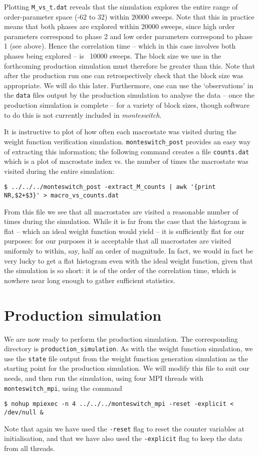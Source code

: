 \documentclass{report}
\begin{document}
Plotting \texttt{M\_vs\_t.dat} reveals that the simulation explores the entire range of order-parameter space (-62 to 32) within 20000 sweeps. Note that this
in practice means that both phases are explored within 20000 sweeps, since high order parameters correspond to phase 2 and low order parameters correspond
to phase 1 (see above). Hence the correlation time -- which in this case involves both phases being explored -- is ~10000 sweeps. The 
block size we use in the
forthcoming production simulation must therefore be greater than this. Note that after the production run one can retrospectively check that the
block size was appropriate. We will do this later. Furthermore, one can use the `observations' in the \texttt{data} files output by the production simulation to
analyse the data -- once the production simulation is complete -- for a variety of block sizes, though software to do this is not currently included in
\emph{monteswitch}.

It is instructive to plot of how often each macrostate was visited during the weight function verification simulation. \texttt{monteswitch\_post}
provides an easy way of extracting this information; the following command creates a file \texttt{counts.dat} which is a plot of macrostate index vs. the
number of times the  macrostate was visited during the entire simulation:
\begin{verbatim}
$ ../../../monteswitch_post -extract_M_counts | awk '{print 
NR,$2+$3}' > macro_vs_counts.dat
\end{verbatim}
From this file we see that all macrostates are visited a reasonable number of times during the simulation. While it is far from the case that the
histogram is flat -- which an ideal weight function would yield -- it is sufficiently flat for our purposes: for our purposes it is acceptable that
all macrostates are visited uniformly to within, say, half an order of magnitude. In fact, we would in fact be very lucky to get a flat histogram
even with the ideal weight function, given that the simulation is so short: it is of the order of the correlation time, which is nowhere near long
enough to gather sufficient statistics.


\section{Production simulation}
We are now ready to perform the production simulation. The corresponding directory is \texttt{production\_simulation}.
As with the weight function simulation, we use the \texttt{state} file output from the weight function generation simulation as the starting point
for the production simulation. We will modify this file to suit our needs, and then run the simulation, using four MPI threads with \texttt{monteswitch\_mpi},
using the command
\begin{verbatim}
$ nohup mpiexec -n 4 ../../../monteswitch_mpi -reset -explicit <
/dev/null &
\end{verbatim}
Note that again we have used the \texttt{-reset} flag to reset the counter variables at initialisation, and that we have also used the \texttt{-explicit}
flag to keep the data from all threads.
\end{document}
